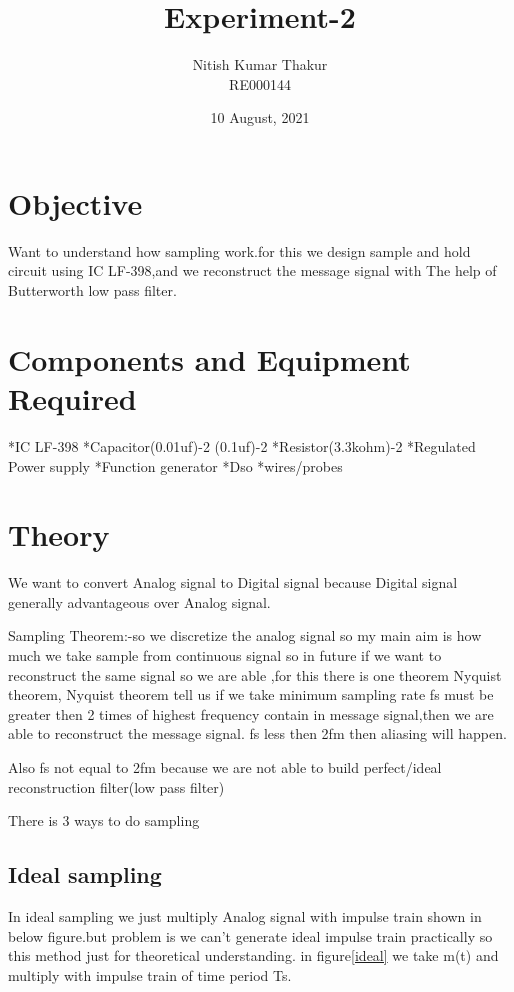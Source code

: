 \documentclass{article}
\title{Experiment-2}
\author{Nitish Kumar Thakur \\ RE000144 }
\date{10 August, 2021}
\begin{document}
\maketitle

\section{Objective}
Want to understand how sampling work.for this we design sample and hold circuit using IC LF-398,and we reconstruct the message signal with The help of Butterworth low pass filter. 

\section{Components and Equipment Required}                
*IC LF-398 *Capacitor(0.01uf)-2 (0.1uf)-2 *Resistor(3.3kohm)-2 *Regulated Power supply *Function generator *Dso *wires/probes
 
 
 
 
\section{Theory}
We want to convert Analog signal to Digital signal because Digital signal generally advantageous over Analog signal.\par
Sampling Theorem:-so we discretize the analog signal so my main aim is how much we take sample from continuous signal so in future if we want to reconstruct the same signal so we are able ,for this there is one theorem  Nyquist theorem, Nyquist theorem tell us if we take minimum sampling rate fs must be greater then 2 times of highest frequency contain in message signal,then we are able to reconstruct the message signal. fs less then 2fm then aliasing will happen.\par
Also fs not equal to 2fm because we are not able to build perfect/ideal reconstruction filter(low pass filter) \par
There is 3 ways to do sampling 

\subsection{Ideal sampling}
In ideal sampling we just multiply Analog signal with impulse train shown in below figure.but problem is we can't generate ideal impulse train practically so this method just for theoretical understanding.
in figure\ref{ideal} we take m(t) and multiply with impulse train of time period Ts.\par
\end{document}
